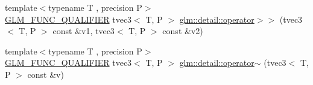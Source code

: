 \begin{DoxyCompactItemize}
\item 
{\footnotesize template$<$typename T , precision P$>$ }\\\hyperlink{setup_8hpp_a33fdea6f91c5f834105f7415e2a64407}{G\+L\+M\+\_\+\+F\+U\+N\+C\+\_\+\+Q\+U\+A\+L\+I\+F\+I\+ER} tvec3$<$ T, P $>$ \hyperlink{namespaceglm_1_1detail_a951d3aa326577d1ad952b75b64bb22e6}{glm\+::detail\+::operator$>$$>$} (tvec3$<$ T, P $>$ const \&v1, tvec3$<$ T, P $>$ const \&v2)
\item 
{\footnotesize template$<$typename T , precision P$>$ }\\\hyperlink{setup_8hpp_a33fdea6f91c5f834105f7415e2a64407}{G\+L\+M\+\_\+\+F\+U\+N\+C\+\_\+\+Q\+U\+A\+L\+I\+F\+I\+ER} tvec3$<$ T, P $>$ \hyperlink{namespaceglm_1_1detail_ab02a83654e913b58982d549eba06ff45}{glm\+::detail\+::operator$\sim$} (tvec3$<$ T, P $>$ const \&v)
\end{DoxyCompactItemize}
